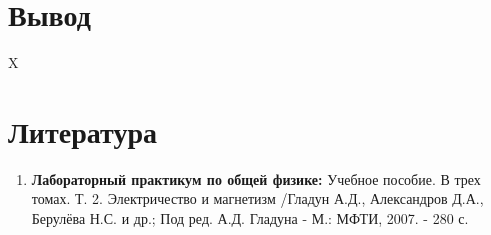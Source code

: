 \documentclass[a4paper, 12pt]{article}%
\begin{document}
\section{Вывод}

X

\section{Литература}

\begin{enumerate}
\item \textbf{Лабораторный практикум по общей физике:} Учебное пособие. В трех томах. Т. 2. Электричество и магнетизм /Гладун А.Д., Александров Д.А., Берулёва Н.С. и др.; Под ред. А.Д. Гладуна - М.: МФТИ, 2007. - 280 с.
\end{enumerate}		
		
					
\end{document}
